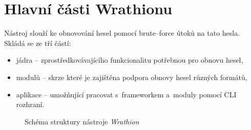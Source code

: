 \section{Hlavní části Wrathionu}
Nástroj slouží ke obnovování hesel pomocí brute--force útoků na tato hesla. Skládá se ze tří
částí:
\begin{itemize}
	\item jádra -- zprostředkovávajícího funkcionalitu potřebnou pro obnovu hesel,
	\item modulů -- skrze které je zajištěna podpora obnovy hesel různých formátů,
	\item aplikace -- umožňující pracovat s~frameworkem a~moduly pomocí CLI rozhraní.
\end{itemize}
\begin{figure}[ht]
    \begin{center}
    \end{center}
    \caption{Schéma struktury nástroje {\it Wrathion} \cite{Hranicky}}
    \label{memory}
\end{figure}
